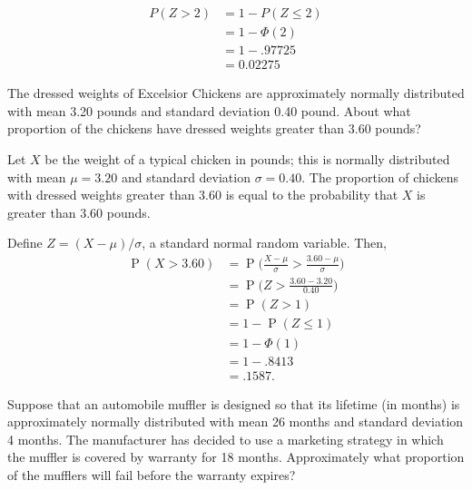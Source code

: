 \documentclass[11pt]{exam}
\DeclareMathOperator*{\Prob}{P}
\renewcommand{\Pr}{\Prob}
\begin{document}
\begin{questions}
\begin{solution}
\begin{align*}
  P(Z > 2) &= 1 - P(Z \leq 2) \\
  	      &= 1 - \Phi(2) \\
	      &= 1 - .97725 \\
	      &= 0.02275
\end{align*}
\end{solution}



\newpage



\question The dressed weights of Excelsior Chickens are approximately normally
distributed with mean 3.20 pounds and standard deviation 0.40 pound.  About
what proportion of the chickens have dressed weights greater than 3.60 pounds?

\begin{solution}
Let $X$ be the weight of a typical chicken in pounds; this is normally distributed with
mean $\mu = 3.20$ and standard deviation $\sigma = 0.40$.  The proportion of
chickens with dressed weights greater than 3.60 is equal to the probability
that $X$ is greater than 3.60 pounds.

Define
$Z = (X - \mu)/\sigma$, a standard normal random variable.  Then,
\begin{align*}
  \Pr(X > 3.60)
    &= \Pr\Big(\frac{X - \mu}{\sigma} > \frac{3.60 - \mu}{\sigma}\Big) \\
    &= \Pr\Big(Z > \frac{3.60 - 3.20}{0.40}\Big) \\
    &= \Pr(Z > 1) \\
    &= 1 - \Pr(Z \leq 1) \\
    &= 1 - \Phi(1) \\
    &= 1 - .8413 \\
    &= .1587.
\end{align*}
\end{solution}




\ifprintanswers\newpage\fi

\question Suppose that an automobile muffler is designed so that its lifetime (in
months) is approximately normally distributed with mean 26 months and standard
deviation 4 months.  The manufacturer has decided to use a marketing strategy
in which the muffler is covered by warranty for 18 months.  Approximately what
proportion of the mufflers will fail before the warranty expires?


\end{questions}
\end{document}

